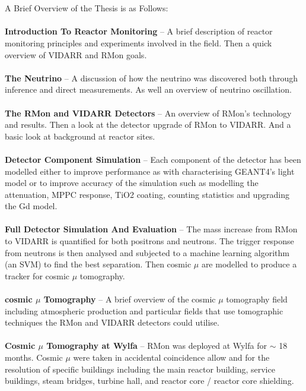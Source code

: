 \\\\A Brief Overview of the Thesis is as Follows:
\\\\\textbf{Introduction To Reactor Monitoring} -- A brief description of reactor monitoring principles and experiments involved in the field. Then a quick overview of VIDARR and RMon goals.  
\\\\\textbf{The Neutrino} -- A discussion of how the neutrino was discovered both through inference and direct measurements. As well an overview of neutrino oscillation.
\\\\\textbf{The RMon and VIDARR Detectors} -- An overview of RMon's technology and results. Then a look at the detector upgrade of RMon to VIDARR. And a basic look at background at reactor sites.
\\\\\textbf{Detector Component Simulation} -- Each component of the detector has been modelled either to improve performance as with characterising GEANT4's light model or to improve accuracy of the simulation such as modelling the attenuation, MPPC response, TiO2 coating, counting statistics and upgrading the Gd model. 
\\\\\textbf{Full Detector Simulation And Evaluation} -- The mass increase from RMon to VIDARR is quantified for both positrons and neutrons. The trigger response from neutrons is then analysed and subjected to a machine learning algorithm (an SVM) to find the best separation. Then cosmic $\mu$ are modelled to produce a tracker for cosmic $\mu$ tomography.
\\\\\textbf{cosmic $\mu$ Tomography} -- A brief overview of the cosmic $\mu$ tomography field including atmospheric production and particular fields that use tomographic techniques the RMon and VIDARR detectors could utilise. 
\\\\\textbf{Cosmic $\mu$ Tomography at Wylfa} -- RMon was deployed at Wylfa for $\sim$ 18 months. Cosmic $\mu$ were taken in accidental coincidence allow and for the resolution of specific buildings including the main reactor building, service buildings, steam bridges, turbine hall, and reactor core / reactor core shielding.